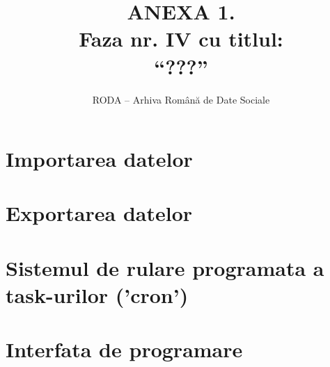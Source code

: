 \documentclass[11pt,twoside,romanian]{extbook}
\begin{document}
\fancyhead[RE,LO]{\thepage}


\title{ANEXA 1.\\
Faza nr. IV 
cu titlul:\\
``???''
}

\author{RODA -- Arhiva Rom\^{a}n\u{a} de Date Sociale}

\date{ }

\maketitle

\newpage
\thispagestyle{plain}
\tableofcontents{}
\setcounter{page}{1}

\chapter{Importarea datelor}


\chapter{Exportarea datelor}


\chapter{Sistemul de rulare programata a task-urilor ('cron')}




\chapter{Interfata de programare}

\end{document}
